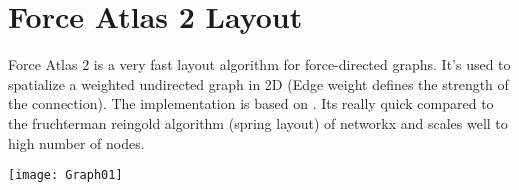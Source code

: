 \documentclass[10pt,a4paper,openany]{article}
\begin{document}
\newpage

	\section*{Force Atlas 2 Layout}
	Force Atlas 2 is a very fast layout algorithm for force-directed graphs. It's used to spatialize a weighted undirected graph in 2D (Edge weight defines the strength of the connection). The implementation is based on \citep{jacomy2014forceatlas2}. Its really quick compared to the fruchterman reingold algorithm (spring layout) of networkx and scales well to high number of nodes.
	
	
	
	\begin{center}
		\texttt{[image: Graph01]}
	\end{center}
	

	
	
	
\end{document}

